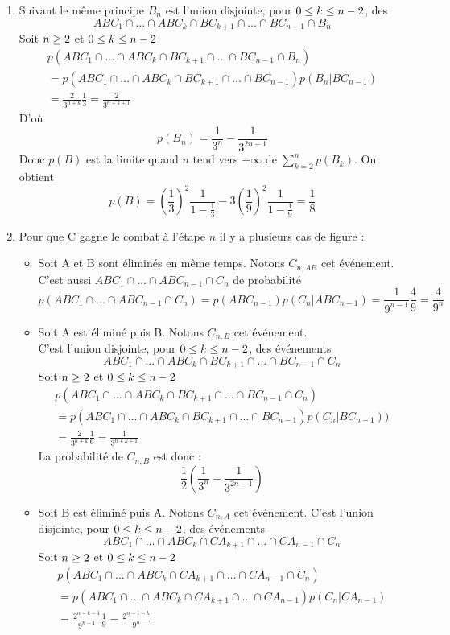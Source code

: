 \begin{enumerate}
\begin{enumerate}
\item Suivant  le même principe $B_n$ est l'union disjointe, pour $0 \leq k \leq n - 2$, des 
$$ABC_1 \cap \dots \cap ABC_k \cap BC_{k+1} \cap \dots \cap BC_{n-1} \cap B_n$$
Soit $n\geq 2$ et  $0 \leq k \leq n - 2$
\begin{multline*}
p(ABC_1 \cap \dots \cap ABC_k \cap BC_{k+1} \cap \dots \cap BC_{n-1} \cap B_n)\\
 = p(ABC_1 \cap \dots \cap ABC_k \cap BC_{k+1} \cap \dots \cap BC_{n-1})p(B_n|BC_{n-1})\\
 = \frac 2{3^{n+k}}\frac 13=\frac{2}{3^{n+k+1}}
\end{multline*}
D'où
$$p(B_n)=\frac1{3^n}-\frac1{3^{2n-1}}$$
Donc $p(B)$ est la limite quand $n$ tend vers $+\infty$ de  
$\sum_{k=2}^n p(B_k)$. On obtient 
\begin{displaymath}
  p(B) = \left(\frac{1}{3} \right)^{2}\frac{1}{1-\frac{1}{3}}- 3\left(\frac{1}{9} \right)^{2}\frac{1}{1-\frac{1}{9}}
  =\frac{1}{8}
\end{displaymath}
\item Pour que C gagne le combat à l'étape $n$ il y a plusieurs cas de figure :
\begin{itemize}
\item Soit A et B sont éliminés en même temps. Notons $C_{n,AB}$ cet événement.\\
C'est aussi $ABC_1\cap\dots\cap ABC_{n-1}\cap C_n$ de probabilité $$p(ABC_1\cap\dots\cap ABC_{n-1}\cap C_n)=p(ABC_{n-1})p(C_n|ABC_{n-1})=\frac{1}{9^{n-1}}\frac 49=\frac4{9^{n}}$$

\item Soit A est  éliminé puis B. Notons $C_{n,B}$ cet événement.\\
C'est l'union disjointe, pour  $0 \leq k \leq n - 2$, des événements  
$$ABC_1 \cap \dots \cap ABC_k \cap BC_{k+1} \cap \dots \cap BC_{n-1} \cap C_n$$
Soit $n\geq 2$ et  $0 \leq k \leq n - 2$
\begin{multline*}
p(ABC_1 \cap \dots \cap ABC_k \cap BC_{k+1} \cap \dots \cap BC_{n-1} \cap C_n)\\
 = p(ABC_1 \cap \dots \cap ABC_k \cap BC_{k+1} \cap \dots \cap BC_{n-1})p(C_n|BC_{n-1}))\\
 = \frac 2{3^{n+k}}\frac 16=\frac{1}{3^{n+k+1}}  
\end{multline*}
La probabilité de $C_{n,B}$ est donc :
$$\frac12(\frac1{3^n}-\frac1{3^{2n-1}})$$

\item Soit B est éliminé puis A. Notons $C_{n,A}$ cet événement. C'est l'union disjointe, pour $0 \leq k \leq n - 2$, des événements  
$$ABC_1 \cap \dots \cap ABC_k \cap CA_{k+1} \cap \dots \cap CA_{n-1} \cap C_n$$
Soit $n\geq 2$ et  $0 \leq k \leq n - 2$
\begin{multline*}
p(ABC_1 \cap \dots \cap ABC_k \cap CA_{k+1} \cap \dots \cap CA_{n-1} \cap C_n)\\
 = p(ABC_1 \cap \dots \cap ABC_k \cap CA_{k+1} \cap \dots \cap CA_{n-1})p(C_n|CA_{n-1})\\
 = \frac{2^{n-k-1}}{9^{n-1}}\frac 19=\frac{2^{n-1-k}}{9^n}
\end{multline*}
 

\end{itemize}
\end{enumerate}
\end{enumerate}

